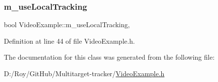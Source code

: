 \subsubsection{\texorpdfstring{m\+\_\+use\+Local\+Tracking}{m\_useLocalTracking}}
{\footnotesize\ttfamily bool Video\+Example\+::m\+\_\+use\+Local\+Tracking\hspace{0.3cm}{\ttfamily [protected]}, {\ttfamily [inherited]}}



Definition at line 44 of file Video\+Example.\+h.



The documentation for this class was generated from the following file\+:\begin{DoxyCompactItemize}
\item 
D\+:/\+Roy/\+Git\+Hub/\+Multitarget-\/tracker/\mbox{\hyperlink{_video_example_8h}{Video\+Example.\+h}}\end{DoxyCompactItemize}
